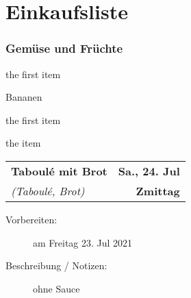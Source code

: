 \documentclass[11pt,a4paper]{article}%
\begin{document}
\section*{Einkaufsliste}%
\label{sec:Einkaufsliste}%

%
\setlength%
\columnsep{40pt}%
\subsubsection*{Gemüse und Früchte}%
\label{ssubsec:GemseundFrchte}%

%
\begin{multicols}{2}
\small
\begin{description}[leftmargin=1.75cm, itemsep=4pt]%
\setlength{\itemsep}{0pt}%
\setlength{\parskip}{0pt}%
\item[100g]%
the first item%
\item[23 Stk.]%
Bananen%
\item[100g]%
the first item%
\item[10g]%
the item%
\end{description}
\end{multicols}%
\newpage%
\renewcommand{\arraystretch}{1.75}%
%
%


\begin{table}%
\begin{tabularx}{\textwidth}{X r}%
\LARGE \textbf{Taboulé mit Brot}&\color{gray} \large \textbf{Sa., 24. Jul}\\%
\small \textit{(Taboulé, Brot)}&\color{gray} \large \textbf{Zmittag}\\%
\hline%
\end{tabularx}%
\end{table}

%
\begin{description}%
\item[Vorbereiten:]%
am Freitag 23. Jul 2021%
\item[Beschreibung / Notizen:]%
ohne Sauce%
\end{description}%
\vspace{0.75cm}%
\renewcommand{\arraystretch}{1.25}%
\end{document}

